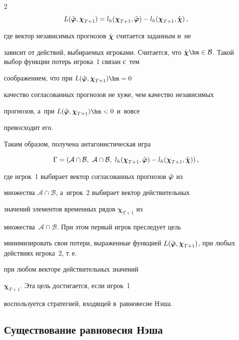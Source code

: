 \begin{multicols}{2}
$$

    L(\hphi, \boldsymbol{\chi}_{T+1}) = l_h(\boldsymbol{\chi}_{T+1}, \hphi) - l_h(\boldsymbol{\chi}_{T+1}, \hchi)\,,

$$

где вектор независимых прогнозов $\hat{\boldsymbol{\chi}}$ считается заданным и~не

зависит от действий, выбираемых игроками. Считается, что $\hchi

\hm\in \mathcal{B}$. Такой выбор функции потерь игрока~1 связан с~тем

соображением, что при $L(\hphi, \boldsymbol{\chi}_{T+1}) \hm= 0$

качество согласованных прогнозов не хуже, чем качество независимых

прогнозов, а~при $L(\hphi, \boldsymbol{\chi}_{T+1}) \hm< 0$ и~вовсе

превосходит его.



Таким образом, получена антагонистическая игра

\begin{equation}

\label{eq:game}

    \Gamma = (\mathcal{A} \cap \mathcal{B},~\mathcal{A} \cap \mathcal{B},~l_h(\boldsymbol{\chi}_{T+1}, \hphi) - l_h(\boldsymbol{\chi}_{T+1}, \hchi))\,,

\end{equation}

где игрок~1 выбирает вектор согласованных прогнозов $\hat{\boldsymbol{\varphi}}$ из

множества $\mathcal{A} \cap \mathcal{B}$, а~игрок~2 выбирает вектор действительных

значений элементов временн$\acute{\mbox{ы}}$х рядов $\boldsymbol{\chi}_{T+1}$ из

множества~$\mathcal{A} \cap \mathcal{B}$. При этом первый игрок преследует цель

минимизировать свои потери, выраженные функцией $L(\hphi,

\boldsymbol{\chi}_{T+1})$, при любых действиях игрока~2, т.\,е.\

при любом векторе действительных значений

$\boldsymbol{\chi}_{T+1}$. Эта цель достигается, если игрок~1

воспользуется стратегией, входящей в~равновесие Нэша.



\subsection{Существование равновесия Нэша}




\end{multicols}
